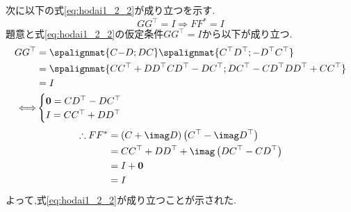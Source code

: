 \documentclass[dvipdfmx,titlepage, 11pt, a4paper]{jsarticle}%
\begin{document}
\begin{enumerate}[(1)]
    次に以下の式\eqref{eq:hodai1_2_2}が成り立つを示す.
    \begin{equation}
        GG^{\top} = I \Rightarrow FF^{\ast} = I \label{eq:hodai1_2_2}
    \end{equation}
    題意と式\eqref{eq:hodai1_2_2}の仮定条件$GG^{\top} = I$から以下が成り立つ.
    \begin{align*}
        GG^{\top} & = 
        \spalignmat{
            C {-D};
            D {C}
        }
        \spalignmat{
            {C^{\top}} {D^{\top}};
            {-D^{\top}} {C^{\top}}
        }\\
        & = 
        \spalignmat{
            {CC^{\top} + DD^{\top}} {CD^{\top} - DC^{\top}};
            {DC^{\top} - CD^{\top}} {DD^{\top} + CC^{\top}}
        }\\
        & = I\\
        \Longleftrightarrow &
        \begin{cases}
            \mbox{\boldmath $0$} = CD^{\top} - DC^{\top}\\
            I = CC^{\top} + DD^{\top}
        \end{cases}
    \end{align*}
    \begin{align*}
        \therefore FF^{\ast} & = \left(C + \imag D\right)\left(C^{\top} - \imag D^{\top}\right)\\
            & = CC^{\top} + DD^{\top} + \imag \left(DC^{\top} - CD^{\top}\right)\\
            & = I + \mbox{\boldmath $0$}\\
            & = I
    \end{align*}
    よって,式\eqref{eq:hodai1_2_2}が成り立つことが示された.


\end{enumerate}
\end{document}
